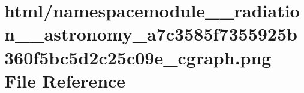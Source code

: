 \hypertarget{namespacemodule____radiation____astronomy__a7c3585f7355925b360f5bc5d2c25c09e__cgraph_8png}{}\section{html/namespacemodule\+\_\+\+\_\+radiation\+\_\+\+\_\+astronomy\+\_\+a7c3585f7355925b360f5bc5d2c25c09e\+\_\+cgraph.png File Reference}
\label{namespacemodule____radiation____astronomy__a7c3585f7355925b360f5bc5d2c25c09e__cgraph_8png}
